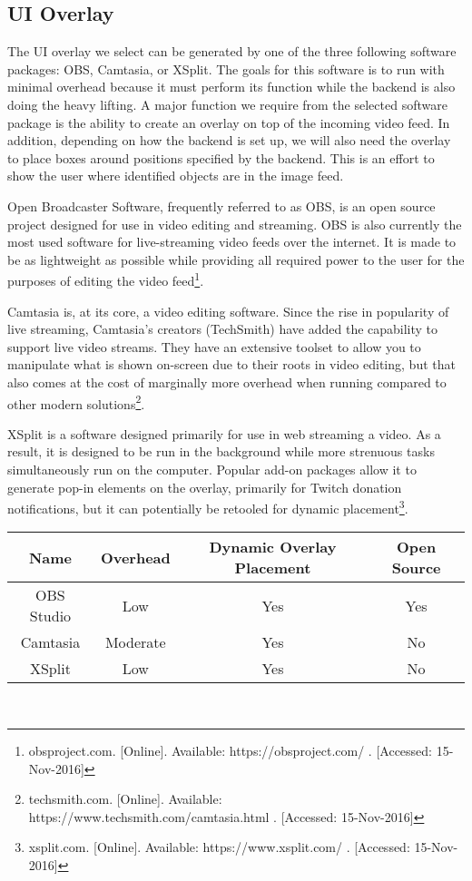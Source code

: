\documentclass[letterpaper,10pt,onecolumn,draftclsnofoot]{IEEEtran}
\begin{document}
\newpage
\subsection{UI Overlay} %

The UI overlay we select can be generated by one of the three following software packages:  OBS, Camtasia, or XSplit.  The goals for this software is to run with minimal overhead because it must perform its function while the backend is also doing the heavy lifting.  A major function we require from the selected software package is the ability to create an overlay on top of the incoming video feed.  In addition, depending on how the backend is set up, we will also need the overlay to place boxes around positions specified by the backend.  This is an effort to show the user where identified objects are in the image feed.

Open Broadcaster Software, frequently referred to as OBS, is an open source project designed for use in video editing and streaming.  OBS is also currently the most used software for live-streaming video feeds over the internet.  It is made to be as lightweight as possible while providing all required power to the user for the purposes of editing the video feed\footnote{obsproject.com. [Online]. Available: https://obsproject.com/ . [Accessed: 15-Nov-2016] }.

Camtasia is, at its core, a video editing software.  Since the rise in popularity of live streaming, Camtasia's creators (TechSmith) have added the capability to support live video streams.  They have an extensive toolset to allow you to manipulate what is shown on-screen due to their roots in video editing, but that also comes at the cost of marginally more overhead when running compared to other modern solutions\footnote{techsmith.com. [Online]. Available: https://www.techsmith.com/camtasia.html . [Accessed: 15-Nov-2016] }.

XSplit is a software designed primarily  for use in web streaming a video.  As a result, it is designed to be run in the background while more strenuous tasks simultaneously run on the computer.  Popular add-on packages allow it to generate pop-in elements on the overlay, primarily  for Twitch donation notifications, but it can potentially be retooled for dynamic placement\footnote{xsplit.com. [Online]. Available: https://www.xsplit.com/ . [Accessed: 15-Nov-2016] }. \\

\begin{tabular}{|c|c|c|c|}
  \hline
  \textbf{Name} & \textbf{Overhead} & \textbf{Dynamic Overlay Placement} & \textbf{Open Source} \\
  \hline
  OBS Studio & Low & Yes & Yes \\ 
  \hline
  Camtasia & Moderate & Yes & No  \\ 
  \hline
  XSplit & Low & Yes & No \\ 
  \hline
\end{tabular} \\
\end{document}
